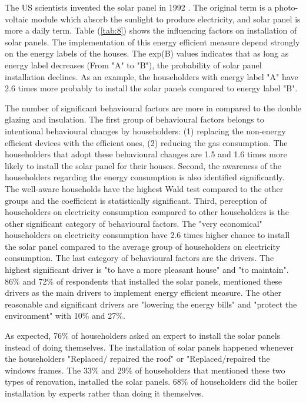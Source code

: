 \documentclass[preprint,12pt,3p]{elsarticle}
\begin{document}
The US scientists invented the solar panel in 1992 \citep{wagner1992}. The original term is a photo-voltaic module which absorb the sunlight to produce electricity, and solar panel is more a daily term. Table (\ref{tab:8}) shows the influencing factors on installation of solar panels. The implementation of this energy efficient measure depend strongly on the energy labels of the houses. The exp(B) values indicates that as long as energy label decreases (From "A" to "B"), the probability of solar panel installation declines. As an example, the householders with energy label "A" have 2.6 times more probably to install the solar panels compared to energy label "B". 

The number of significant behavioural factors are more in compared to the double glazing and insulation. The first group of behavioural factors belongs to intentional behavioural changes by householders: (1) replacing the non-energy efficient devices with the efficient ones, (2) reducing the gas consumption. The householders that adopt these behavioural changes are 1.5 and 1.6 times more likely to install the solar panel for their houses. Second, the awareness of the householders regarding the energy consumption is also identified significantly. The well-aware households have the highest Wald test compared to the other groups and the coefficient is statistically significant. Third, perception of householders on electricity consumption compared to other householders is the other significant category of behavioural factors. The "very economical" householders on electricity consumption have 2.6 times higher chance to install the solar panel compared to the average group of householders on electricity consumption. The last category of behavioural factors are the drivers. The highest significant driver is "to have a more pleasant house" and "to maintain". 86\% and 72\% of respondents that installed the solar panels, mentioned these drivers as the main drivers to implement energy efficient measure. The other reasonable and significant drivers are "lowering the energy bills" and "protect the environment" with 10\% and 27\%. 

As expected, 76\% of householders asked an expert to install the solar panels instead of doing themselves. The installation of solar panels happened whenever the householders "Replaced/ repaired the roof" or "Replaced/repaired the windows frames. The 33\% and 29\% of householders that mentioned these two types of renovation, installed the solar panels. 68\% of householders did the boiler installation by experts rather than doing it themselves. 
\end{document}
